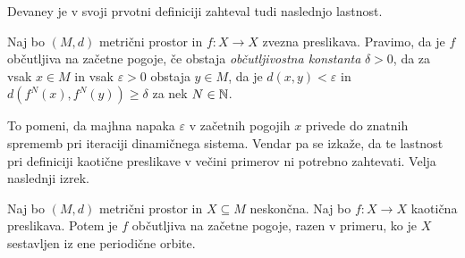 Devaney je v svoji prvotni definiciji zahteval tudi naslednjo lastnost.

\begin{definicija}
    Naj bo \((M, d)\) metrični prostor in \(f \colon X \to X\) zvezna preslikava. Pravimo, da je \(f\) občutljiva na začetne pogoje, če obstaja \emph{občutljivostna konstanta} \(\delta > 0\), da za vsak \(x \in M\) in vsak \(\varepsilon > 0\) obstaja \(y \in M\), da je \(d (x, y) < \varepsilon\) in \(d (f^N (x), f^N (y)) \geq \delta\) za nek \(N \in \mathbb N\).
\end{definicija}

\noindent To pomeni, da majhna napaka \(\varepsilon\) v začetnih pogojih \(x\) privede do znatnih sprememb pri iteraciji dinamičnega sistema. Vendar pa se izkaže, da te lastnost pri definiciji kaotične preslikave v večini primerov ni potrebno zahtevati. Velja naslednji izrek.

\begin{izrek}
    Naj bo \((M, d)\) metrični prostor in \(X \subseteq M\) neskončna. Naj bo \(f \colon X \to X\) kaotična preslikava. Potem je \(f\) občutljiva na začetne pogoje, razen v primeru, ko je \(X\) sestavljen iz ene periodične orbite.
\end{izrek}

